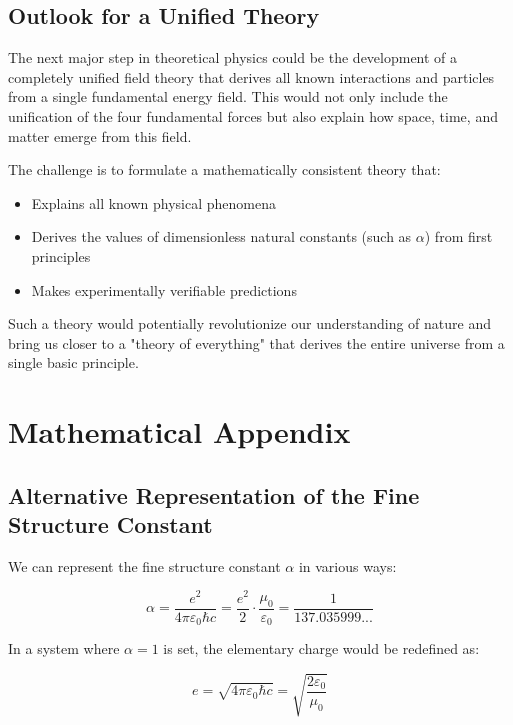 \documentclass{article}
\begin{document}
\subsection{Outlook for a Unified Theory}

The next major step in theoretical physics could be the development of a completely unified field theory that derives all known interactions and particles from a single fundamental energy field. This would not only include the unification of the four fundamental forces but also explain how space, time, and matter emerge from this field.

The challenge is to formulate a mathematically consistent theory that:

\begin{itemize}
	\item Explains all known physical phenomena
	\item Derives the values of dimensionless natural constants (such as $\alpha$) from first principles
	\item Makes experimentally verifiable predictions
\end{itemize}

Such a theory would potentially revolutionize our understanding of nature and bring us closer to a "theory of everything" that derives the entire universe from a single basic principle.

\section{Mathematical Appendix}

\subsection{Alternative Representation of the Fine Structure Constant}

We can represent the fine structure constant $\alpha$ in various ways:

\begin{equation}
	\alpha = \frac{e^2}{4\pi\varepsilon_0\hbar c} = \frac{e^2}{2} \cdot \frac{\mu_0}{\varepsilon_0} = \frac{1}{137.035999...}
\end{equation}

In a system where $\alpha = 1$ is set, the elementary charge would be redefined as:

\begin{equation}
	e = \sqrt{4\pi\varepsilon_0\hbar c} = \sqrt{\frac{2\varepsilon_0}{\mu_0}}
\end{equation}
\end{document}
